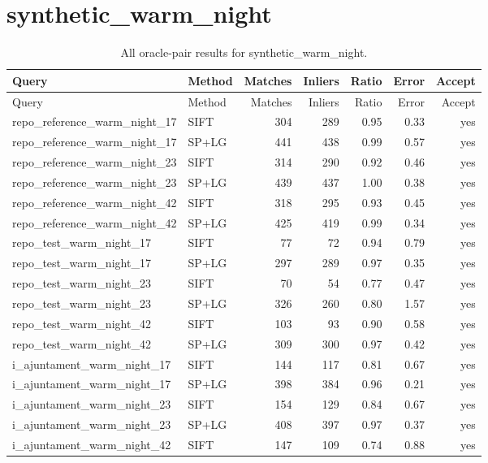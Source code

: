 \section{synthetic\_warm\_night}
\begingroup\scriptsize\setlength{\tabcolsep}{3pt}
\begin{longtable}{llrrrrr}
\caption{All oracle-pair results for synthetic\_warm\_night.}\\
\toprule
Query & Method & Matches & Inliers & Ratio & Error & Accept\\\midrule\endfirsthead
\toprule Query & Method & Matches & Inliers & Ratio & Error & Accept\\\midrule\endhead
\bottomrule\endfoot
repo\_reference\_warm\_night\_17 & SIFT & 304 & 289 & 0.95 & 0.33 & yes \\
repo\_reference\_warm\_night\_17 & SP+LG & 441 & 438 & 0.99 & 0.57 & yes \\
repo\_reference\_warm\_night\_23 & SIFT & 314 & 290 & 0.92 & 0.46 & yes \\
repo\_reference\_warm\_night\_23 & SP+LG & 439 & 437 & 1.00 & 0.38 & yes \\
repo\_reference\_warm\_night\_42 & SIFT & 318 & 295 & 0.93 & 0.45 & yes \\
repo\_reference\_warm\_night\_42 & SP+LG & 425 & 419 & 0.99 & 0.34 & yes \\
repo\_test\_warm\_night\_17 & SIFT & 77 & 72 & 0.94 & 0.79 & yes \\
repo\_test\_warm\_night\_17 & SP+LG & 297 & 289 & 0.97 & 0.35 & yes \\
repo\_test\_warm\_night\_23 & SIFT & 70 & 54 & 0.77 & 0.47 & yes \\
repo\_test\_warm\_night\_23 & SP+LG & 326 & 260 & 0.80 & 1.57 & yes \\
repo\_test\_warm\_night\_42 & SIFT & 103 & 93 & 0.90 & 0.58 & yes \\
repo\_test\_warm\_night\_42 & SP+LG & 309 & 300 & 0.97 & 0.42 & yes \\
i\_ajuntament\_warm\_night\_17 & SIFT & 144 & 117 & 0.81 & 0.67 & yes \\
i\_ajuntament\_warm\_night\_17 & SP+LG & 398 & 384 & 0.96 & 0.21 & yes \\
i\_ajuntament\_warm\_night\_23 & SIFT & 154 & 129 & 0.84 & 0.67 & yes \\
i\_ajuntament\_warm\_night\_23 & SP+LG & 408 & 397 & 0.97 & 0.37 & yes \\
i\_ajuntament\_warm\_night\_42 & SIFT & 147 & 109 & 0.74 & 0.88 & yes \\

\end{longtable}
